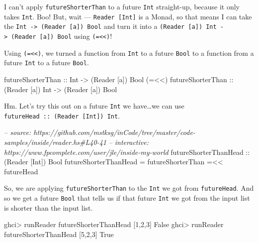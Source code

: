 \documentclass[]{article}
\newenvironment{Shaded}{}{}
\newcommand{\DataTypeTok}[1]{\textcolor[rgb]{0.56,0.13,0.00}{{#1}}}
\newcommand{\DecValTok}[1]{\textcolor[rgb]{0.25,0.63,0.44}{{#1}}}
\newcommand{\CommentTok}[1]{\textcolor[rgb]{0.38,0.63,0.69}{\textit{{#1}}}}
\newcommand{\OtherTok}[1]{\textcolor[rgb]{0.00,0.44,0.13}{{#1}}}
\newcommand{\FunctionTok}[1]{\textcolor[rgb]{0.02,0.16,0.49}{{#1}}}
\newcommand{\NormalTok}[1]{{#1}}
\begin{document}
I can't apply \texttt{futureShorterThan} to a future \texttt{Int}
straight-up, because it only takes \texttt{Int}. Boo! But, wait ---
\texttt{Reader\ {[}Int{]}} is a Monad, so that means I can take the
\texttt{Int\ -\textgreater{}\ (Reader\ {[}a{]})\ Bool} and turn it into
a
\texttt{(Reader\ {[}a{]})\ Int\ -\textgreater{}\ (Reader\ {[}a{]})\ Bool}
using \texttt{(=\textless{}\textless{})}!

Using \texttt{(=\textless{}\textless{})}, we turned a function from
\texttt{Int} to a future \texttt{Bool} to a function from a future
\texttt{Int} to a future \texttt{Bool}.

\begin{Shaded}
\begin{Highlighting}[]
\OtherTok{futureShorterThan       ::} \DataTypeTok{Int}              \OtherTok{->} \NormalTok{(}\DataTypeTok{Reader} \NormalTok{[a]) }\DataTypeTok{Bool}
\NormalTok{(}\FunctionTok{=<<}\NormalTok{)}\OtherTok{ futureShorterThan ::} \NormalTok{(}\DataTypeTok{Reader} \NormalTok{[a]) }\DataTypeTok{Int} \OtherTok{->} \NormalTok{(}\DataTypeTok{Reader} \NormalTok{[a]) }\DataTypeTok{Bool}
\end{Highlighting}
\end{Shaded}

Hm. Let's try this out on a future \texttt{Int} we have\ldots{}we can
use \texttt{futureHead\ ::\ (Reader\ {[}Int{]})\ Int}.

\begin{Shaded}
\begin{Highlighting}[]
\CommentTok{-- source: https://github.com/mstksg/inCode/tree/master/code-samples/inside/reader.hs#L40-41}
\CommentTok{-- interactive: https://www.fpcomplete.com/user/jle/inside-my-world}
\OtherTok{futureShorterThanHead ::} \NormalTok{(}\DataTypeTok{Reader} \NormalTok{[}\DataTypeTok{Int}\NormalTok{]) }\DataTypeTok{Bool}
\NormalTok{futureShorterThanHead }\FunctionTok{=} \NormalTok{futureShorterThan }\FunctionTok{=<<} \NormalTok{futureHead}
\end{Highlighting}
\end{Shaded}

So, we are applying \texttt{futureShorterThan} to the \texttt{Int} we
got from \texttt{futureHead}. And so we get a future \texttt{Bool} that
tells us if that future \texttt{Int} we got from the input list is
shorter than the input list.

\begin{Shaded}
\begin{Highlighting}[]
\NormalTok{ghci}\FunctionTok{>} \NormalTok{runReader futureShorterThanHead [}\DecValTok{1}\NormalTok{,}\DecValTok{2}\NormalTok{,}\DecValTok{3}\NormalTok{]}
\DataTypeTok{False}
\NormalTok{ghci}\FunctionTok{>} \NormalTok{runReader futureShorterThanHead [}\DecValTok{5}\NormalTok{,}\DecValTok{2}\NormalTok{,}\DecValTok{3}\NormalTok{]}
\DataTypeTok{True}
\end{Highlighting}
\end{Shaded}
\end{document}

